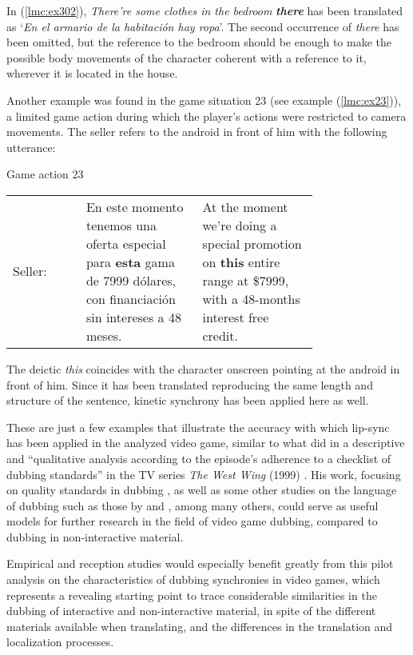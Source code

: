 \documentclass[output=paper]{langsci/langscibook}
\begin{document}
In (\ref{lmc:ex302}), \textit{There're some clothes in the bedroom }\textbf{\textit{there}} has been translated as `\textit{En el armario de la habitación hay ropa}'. The second occurrence of \textit{there} has been omitted, but the reference to the bedroom should be enough to make the possible body movements of the character coherent with a reference to it, wherever it is located in the house.

Another example was found in the game situation 23 (see example (\ref{lmc:ex23})), a limited game action during which the player’s actions were restricted to camera movements. The seller refers to the android in front of him with the following utterance:

\begin{exe}
  \ex Game action 23\label{lmc:ex23}

  \begin{tabular}{lp{0.38\linewidth}p{0.38\linewidth}}
    Seller: &
    \foreignlanguage{spanish}{En este momento tenemos una oferta especial para \textbf{esta} gama de 7999 dólares, con financiación sin intereses a 48 meses.} &
    At the moment we’re doing a special promotion on \textbf{this} entire range at \$7999, with a 48-months interest free credit.
    \\
  \end{tabular}
\end{exe}

The deictic \textit{this} coincides with the character onscreen pointing at the android in front of him. Since it has been translated reproducing the same length and structure of the sentence, kinetic synchrony has been applied here as well.

These are just a few examples that illustrate the accuracy with which lip-sync has been applied in the analyzed video game, similar to what \textcite{chaume16} did in a descriptive and \enquote{qualitative analysis according to the episode’s adherence to a checklist of dubbing standards} in the TV series \textit{The West Wing} (1999) \parencite{chaume16}. His work, focusing on quality standards in dubbing \parencite{chaume07}, as well as some other studies on the language of dubbing such as those by \textcites{banos09}{marti13}{frepav09} and \textcite{martinez08}, among many others, could serve as useful models for further research in the field of video game dubbing, compared to dubbing in non-interactive material.

Empirical and reception studies would especially benefit greatly from this pilot analysis on the characteristics of dubbing synchronies in video games, which represents a revealing starting point to trace considerable similarities in the dubbing of interactive and non-interactive material, in spite of the different materials available when translating, and the differences in the translation and localization processes.
\end{document}
